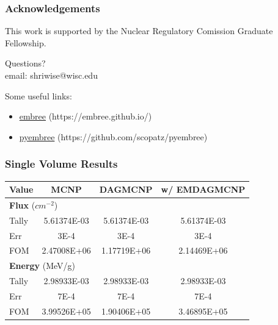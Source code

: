 \documentclass[12pt]{beamer}
\begin{document}
\begin{frame}
  \frametitle{Acknowledgements}
  \begin{center}
    This work is supported by the Nuclear Regulatory Comission Graduate Fellowship.
    \end{center}
  \end{frame}

\begin{frame}

\begin{center}
\vfill
\huge {Questions?} \\
\vfill
\normalsize email: shriwise@wisc.edu
\vfill
\end{center}
\normalsize
Some useful links:
\begin{itemize}
\item \href{https://embree.github.io/}{{\color{blue}embree}} (https://embree.github.io/)
\item \href{https://github.com/scopatz/pyembree}{{\color{blue}pyembree}} (https://github.com/scopatz/pyembree)
\end{itemize}

\end{frame}


\begin{frame}
\frametitle{Single Volume Results}

\begin{table}[h]

  \begin{center}

    \begin{tabular}{lccc}
     \toprule
      Value & MCNP & DAGMCNP & w/ EMDAGMCNP \\
     \toprule
     \multicolumn{4}{l}{\textbf{Flux} ($cm^{-2}$)} \\
     \hline
     Tally & 5.61374E-03 & 5.61374E-03 & 5.61374E-03 \\
     Err & 3E-4 & 3E-4 & 3E-4  \\
     FOM & 2.47008E+06 & 1.17719E+06 & 2.14469E+06 \\
     \hline
     \multicolumn{4}{l}{\textbf{Energy} (MeV/g)} \\
     \hline
     Tally & 2.98933E-03 & 2.98933E-03 & 2.98933E-03 \\
     Err & 7E-4 & 7E-4 & 7E-4 \\
     FOM & 3.99526E+05 & 1.90406E+05 & 3.46895E+05 \\
     \bottomrule
     
    \end{tabular}


  \end{center}
\vspace{-0.4cm}
\end{table}

\end{frame}
\end{document}
